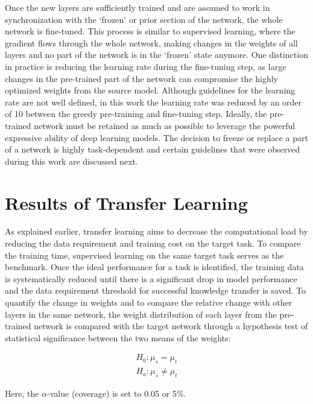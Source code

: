Once the new layers are sufficiently trained and are assumed to work in synchronization with the ‘frozen’ or prior section of the network, the whole network is fine-tuned. This process is similar to supervised learning, where the gradient flows through the whole network, making changes in the weights of all layers and no part of the network is in the ‘frozen’ state anymore. One distinction in practice is reducing the learning rate during the fine-tuning step, as large changes in the pre-trained part of the network can compromise the highly optimized weights from the source model. Although guidelines for the learning rate are not well defined, in this work the learning rate was reduced by an order of 10 between the greedy pre-training and fine-tuning step. 
Ideally, the pre-trained network must be retained as much as possible to leverage the powerful expressive ability of deep learning models. The decision to freeze or replace a part of a network is highly task-dependent and certain guidelines that were observed during this work are discussed next.

\section{Results of Transfer Learning}\label{RNN:9_Results_TL}
As explained earlier, transfer learning aims to decrease the computational load by reducing the data requirement and training cost on the target task. To compare the training time, supervised learning on the same target task serves as the benchmark. Once the ideal performance for a task is identified, the training data is systematically reduced until there is a significant drop in model performance and the data requirement threshold for successful knowledge transfer is saved.
To quantify the change in weights and to compare the relative change with other layers in the same network, the weight distribution of each layer from the pre-trained network is compared with the target network through a hypothesis test of statistical significance between the two means of the weights:

\begin{align}
    H_0 : \mu_s = \mu_t \\
    H_a : \mu_s \neq \mu_t
\end{align}

Here, the $\alpha$-value (coverage) is set to 0.05 or 5\%.

